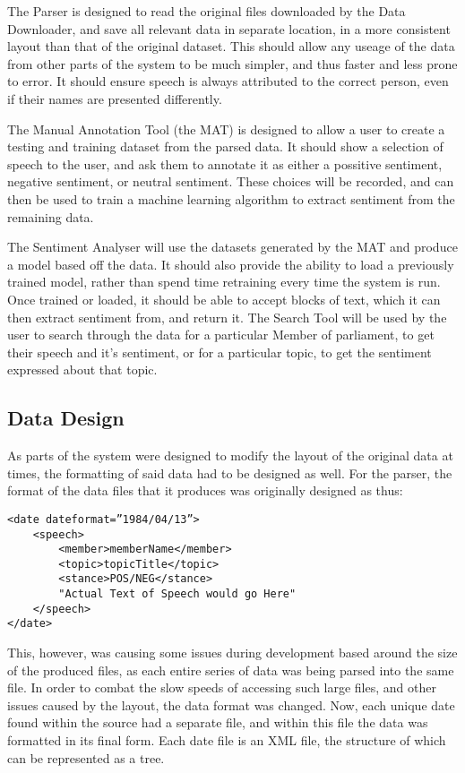 The Parser is designed to read the original files downloaded by the Data Downloader, and save all relevant data in separate location, in a more consistent layout than that of the original dataset. This should allow any useage of the data from other parts of the system to be much simpler, and thus faster and less prone to error. It should ensure speech is always attributed to the correct person, even if their names are presented differently.

The Manual Annotation Tool (the MAT) is designed to allow a user to create a testing and training dataset from the parsed data. It should show a selection of speech to the user, and ask them to annotate it as either a possitive sentiment, negative sentiment, or neutral sentiment. These choices will be recorded, and can then be used to train a machine learning algorithm to extract sentiment from the remaining data.

The Sentiment Analyser will use the datasets generated by the MAT and produce a model based off the data. It should also provide the ability to load a previously trained model, rather than spend time retraining every time the system is run. Once trained or loaded, it should be able to accept blocks of text, which it can then extract sentiment from, and return it.
The Search Tool will be used by the user to search through the data for a particular Member of parliament, to get their speech and it’s sentiment, or for a particular topic, to get the sentiment expressed about that topic. 

\subsection{Data Design}
As parts of the system were designed to modify the layout of the original data at times, the formatting of said data had to be designed as well.
For the parser, the format of the data files that it produces was originally designed as thus:
\begin{verbatim}
<date dateformat=”1984/04/13”>	
    <speech>
        <member>memberName</member>
        <topic>topicTitle</topic>
        <stance>POS/NEG</stance>
        "Actual Text of Speech would go Here"
    </speech>
</date>
\end{verbatim}
This, however, was causing some issues during development based around the size of the produced files, as each entire series of data was being parsed into the same file. In order to combat the slow speeds of accessing such large files, and other issues caused by the layout, the data format was changed. Now, each unique date found within the source had a separate file, and within this file the data was formatted in its final form.
Each date file is an XML file, the structure of which can be represented as a tree.

